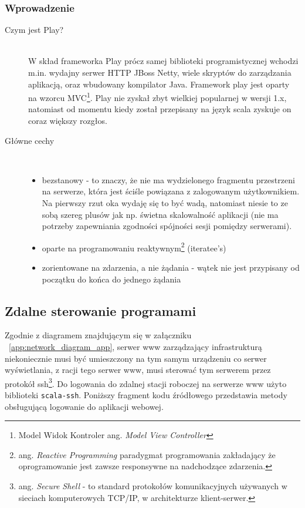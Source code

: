 \subsubsection{Wprowadzenie}
\begin{description}
	\item[Czym jest Play?]\hfill \\
		W skład frameworka Play prócz samej biblioteki programistycznej wchodzi m.in. wydajny serwer HTTP JBoss Netty, wiele skryptów do zarządzania aplikacją, oraz wbudowany kompilator Java. Framework play jest oparty na wzorcu MVC\footnote{Model Widok Kontroler ang. \emph{Model View Controller}}. Play nie zyskał zbyt wielkiej popularnej w wersji 1.x, natomiast od momentu kiedy został przepisany na język scala zyskuje on coraz większy rozgłos.
	\item[Główne cechy]\hfill \\
		\begin{itemize}
			\item bezstanowy - to znaczy, że nie ma wydzielonego fragmentu przestrzeni na serwerze, która jest ściśle powiązana z zalogowanym użytkownikiem. Na pierwszy rzut oka wydaję się to być wadą, natomiast niesie to ze sobą szereg plusów jak np. świetna skalowalność aplikacji (nie ma potrzeby zapewniania zgodności spójności sesji pomiędzy serwerami).
			\item oparte na programowaniu reaktywnym\footnote{ang. \emph{Reactive Programming} paradygmat programowania zakładający że oprogramowanie jest zawsze responsywne na nadchodzące zdarzenia.}
 (iteratee's) 		
		\item zorientowane na zdarzenia, a nie żądania - wątek nie jest przypisany od początku do końca do jednego żądania
		\end{itemize}
\end{description}

\subsection{Zdalne sterowanie programami}

Zgodnie z diagramem znajdującym się w załączniku ~\ref{app:network_diagram_app}, serwer www zarządzający infrastrukturą niekoniecznie musi być umieszczony na tym samym urządzeniu co serwer wyświetlania, z racji tego serwer www, musi sterować tym serwerem przez protokół ssh\footnote{ang. \emph{Secure Shell} - to standard protokołów komunikacyjnych używanych w sieciach komputerowych TCP/IP, w architekturze klient-serwer.\cite{ssh-wiki}}.
Do logowania do zdalnej stacji roboczej na serwerze www użyto biblioteki \lstinline{scala-ssh}. Poniższy fragment kodu źródłowego przedstawia metody obsługującą logowanie do aplikacji webowej.

